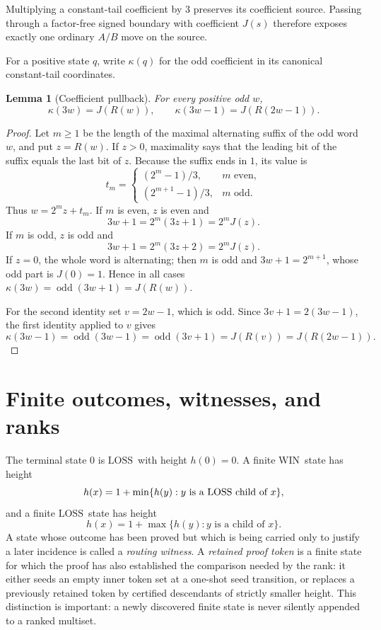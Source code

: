 \documentclass[11pt]{article}
\newtheorem{lemma}[theorem]{Lemma}
\newcommand{\WIN}{\ensuremath{\mathrm{WIN}}}
\newcommand{\LOSS}{\ensuremath{\mathrm{LOSS}}}
\newcommand{\odd}{\operatorname{odd}}
\begin{document}
Multiplying a constant-tail coefficient by $3$ preserves its coefficient
source. Passing through a factor-free signed boundary with coefficient $J(s)$
therefore exposes exactly one ordinary $A/B$ move on the source.

For a positive state $q$, write $\kappa(q)$ for the odd coefficient in its
canonical constant-tail coordinates.

\begin{lemma}[Coefficient pullback]\label{lem:coeff-pullback}
For every positive odd $w$,
\[
  \kappa(3w)=J(R(w)),\qquad
  \kappa(3w-1)=J(R(2w-1)).
\]
\end{lemma}

\begin{proof}
Let $m\ge1$ be the length of the maximal alternating suffix of the odd word
$w$, and put $z=R(w)$. If $z>0$, maximality says that the leading bit of the
suffix equals the last bit of $z$. Because the suffix ends in $1$, its value is
\[
 t_m=\begin{cases}
 (2^m-1)/3,&m\text{ even},\\
 (2^{m+1}-1)/3,&m\text{ odd}.
 \end{cases}
\]
Thus $w=2^mz+t_m$. If $m$ is even, $z$ is even and
\[
  3w+1=2^m(3z+1)=2^mJ(z).
\]
If $m$ is odd, $z$ is odd and
\[
  3w+1=2^m(3z+2)=2^mJ(z).
\]
If $z=0$, the whole word is alternating; then $m$ is odd and
$3w+1=2^{m+1}$, whose odd part is $J(0)=1$. Hence in all cases
$\kappa(3w)=\odd(3w+1)=J(R(w))$.

For the second identity set $v=2w-1$, which is odd. Since
$3v+1=2(3w-1)$, the first identity applied to $v$ gives
\[
 \kappa(3w-1)=\odd(3w-1)=\odd(3v+1)=J(R(v))=J(R(2w-1)).
\]
\end{proof}


\section{Finite outcomes, witnesses, and ranks}

The terminal state $0$ is \LOSS\ with height $h(0)=0$. A finite \WIN\ state has
height
\[
  h(x)=1+\min\{h(y):y\text{ is a \LOSS\ child of }x\},
\]
and a finite \LOSS\ state has height
\[
  h(x)=1+\max\{h(y):y\text{ is a child of }x\}.
\]
A state whose outcome has been proved but which is being carried only to
justify a later incidence is called a \emph{routing witness}. A
\emph{retained proof token} is a finite state for which the proof has also
established the comparison needed by the rank: it either seeds an empty inner
token set at a one-shot seed transition, or replaces a previously retained
token by certified descendants of strictly smaller height. This distinction is
important: a newly discovered finite state is never silently appended to a
ranked multiset.
\end{document}
